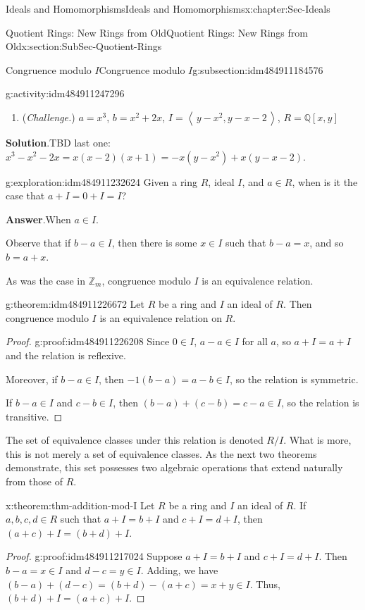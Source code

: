 \documentclass[oneside,10pt,]{book}
\newcommand{\blocktitlefont}{\relax}
\numberwithin{equation}{section}
\newcommand{\ideal}[1]{\left\langle\, #1 \,\right\rangle}
\def\Z{{\mathbb Z}}
\def\Q{{\mathbb Q}}
\begin{document}
\begin{chapterptx}{Ideals and Homomorphisms}{}{Ideals and Homomorphisms}{}{}{x:chapter:Sec-Ideals}
\begin{sectionptx}{Quotient Rings: New Rings from Old}{}{Quotient Rings: New Rings from Old}{}{}{x:section:SubSec-Quotient-Rings}
\begin{subsectionptx}{Congruence modulo \(I\)}{}{Congruence modulo \(I\)}{}{}{g:subsection:idm484911184576}
\begin{activity}{}{g:activity:idm484911247296}
\begin{enumerate}
\item{}(\emph{Challenge.}) \(a = x^3\), \(b = x^2+2x\), \(I = \ideal{y-x^2, y-x-2}\), \(R = \Q[x,y]\)%
\end{enumerate}
\par\smallskip%
\noindent\textbf{\blocktitlefont Solution}.\hypertarget{g:solution:idm484911233264}{}\quad{}TBD last one: \(x^3 - x^2 - 2x = x(x-2)(x+1) = -x(y-x^2) + x(y-x-2)\).\end{activity}
\begin{exploration}{}{g:exploration:idm484911232624}%
Given a ring \(R\), ideal \(I\), and \(a\in R\), when is it the case that \(a + I = 0 + I = I\)?%
\par\smallskip%
\noindent\textbf{\blocktitlefont Answer}.\hypertarget{g:answer:idm484911230416}{}\quad{}When \(a\in I\).%
\end{exploration}
Observe that if \(b-a \in I\), then there is some \(x\in I\) such that \(b-a = x\), and so \(b = a+x\).%
\par
As was the case in \(\Z_m\), congruence modulo \(I\) is an equivalence relation.%
\begin{theorem}{}{}{g:theorem:idm484911226672}%
Let \(R\) be a ring and \(I\) an ideal of \(R\). Then congruence modulo \(I\) is an equivalence relation on \(R\).%
\end{theorem}
\begin{proof}{}{g:proof:idm484911226208}
Since \(0\in I\), \(a-a \in I\) for all \(a\), so \(a + I = a+I\) and the relation is reflexive.%
\par
Moreover, if \(b-a \in I\), then \(-1(b-a) = a-b \in I\), so the relation is symmetric.%
\par
If \(b-a \in I\) and \(c-b\in I\), then \((b-a) + (c-b) = c-a \in I\), so the relation is transitive.%
\end{proof}
The set of equivalence classes under this relation is denoted \(R/I\). What is more, this is not merely a set of equivalence classes. As the next two theorems demonstrate, this set possesses two algebraic operations that extend naturally from those of \(R\).%
\begin{theorem}{}{}{x:theorem:thm-addition-mod-I}%
Let \(R\) be a ring and \(I\) an ideal of \(R\). If \(a,b,c,d\in R\) such that \(a+I = b+I\) and \(c+I = d+I\), then \((a+c) + I = (b+d) + I\).%
\end{theorem}
\begin{proof}{}{g:proof:idm484911217024}
Suppose \(a+I = b+I\) and \(c+I = d+I\). Then \(b-a =x \in I\) and \(d-c = y \in I\). Adding, we have \((b-a) + (d-c) = (b+d) - (a+c) = x+y \in I\). Thus, \((b+d) + I = (a+c) + I\).%

\end{proof}
\end{subsectionptx}
\end{sectionptx}
\end{chapterptx}
\end{document}
